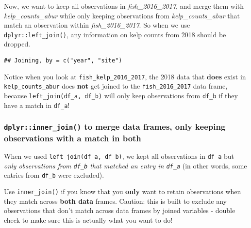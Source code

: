 \documentclass[]{book}
\newenvironment{Shaded}{\begin{snugshade}}{\end{snugshade}}
\newcommand{\DecValTok}[1]{\textcolor[rgb]{0.00,0.00,0.81}{#1}}
\newcommand{\KeywordTok}[1]{\textcolor[rgb]{0.13,0.29,0.53}{\textbf{#1}}}
\newcommand{\NormalTok}[1]{#1}
\newcommand{\OperatorTok}[1]{\textcolor[rgb]{0.81,0.36,0.00}{\textbf{#1}}}
\newcommand{\StringTok}[1]{\textcolor[rgb]{0.31,0.60,0.02}{#1}}
\begin{document}
Now, we want to keep all observations in \emph{fish\_2016\_2017}, and merge them with \emph{kelp\_counts\_abur} while only keeping observations from \emph{kelp\_counts\_abur} that match an observation within \emph{fish\_2016\_2017}. So when we use \texttt{dplyr::left\_join()}, any information on kelp counts from 2018 should be dropped.

\begin{Shaded}
\end{Shaded}

\begin{verbatim}
## Joining, by = c("year", "site")
\end{verbatim}

Notice when you look at \texttt{fish\_kelp\_2016\_2017}, the 2018 data that \textbf{does} exist in \texttt{kelp\_counts\_abur} does \textbf{not} get joined to the \texttt{fish\_2016\_2017} data frame, because \texttt{left\_join(df\_a,\ df\_b)} will only keep observations from \texttt{df\_b} if they have a match in \texttt{df\_a}!

\hypertarget{dplyrinner_join-to-merge-data-frames-only-keeping-observations-with-a-match-in-both}{%
\subsubsection{\texorpdfstring{\texttt{dplyr::inner\_join()} to merge data frames, only keeping observations with a match in \textbf{both}}{dplyr::inner\_join() to merge data frames, only keeping observations with a match in both}}\label{dplyrinner_join-to-merge-data-frames-only-keeping-observations-with-a-match-in-both}}

When we used \texttt{left\_join(df\_a,\ df\_b)}, we kept all observations in \texttt{df\_a} but \emph{only observations from \texttt{df\_b} that matched an entry in \texttt{df\_a}} (in other words, some entries from \texttt{df\_b} were excluded).

Use \texttt{inner\_join()} if you know that you \textbf{only} want to retain observations when they match across \textbf{both data} frames. Caution: this is built to exclude any observations that don't match across data frames by joined variables - double check to make sure this is actually what you want to do!
\end{document}
